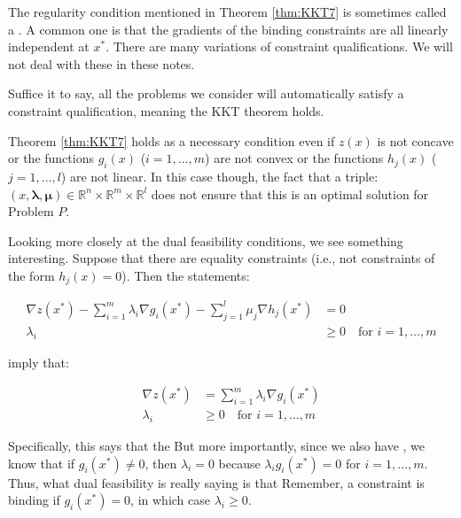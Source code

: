 \begin{remark} The regularity condition mentioned in Theorem \ref{thm:KKT7} is sometimes called a . A common one is that the gradients of the binding constraints are all linearly independent at ${x}^*$. There are many variations of constraint qualifications. We will not deal with these in these notes. 
    
    Suffice it to say, all the problems we consider will automatically satisfy a constraint qualification, meaning the KKT theorem holds.
\end{remark}

\begin{remark} Theorem \ref{thm:KKT7} holds as a necessary condition even if $z({x})$ is not concave or the functions $g_i({x})$ ($i=1,\dots,m$) are not convex or the functions $h_j({x})$ ($j=1,\dots,l$) are not linear. In this case though, the fact that a triple: $({x},\boldsymbol{\lambda}, \boldsymbol{\mu}) \in \mathbb{R}^{n} \times \mathbb{R}^m \times \mathbb{R}^l$ does not ensure that this is an optimal solution for Problem $P$.
\end{remark}

Looking more closely at the dual feasibility conditions, we see something interesting. Suppose that there are  equality constraints (i.e., not constraints of the form $h_j({x}) = 0$). Then the statements:

\begin{displaymath}
\begin{aligned}
\nabla z({x}^*) - \sum_{i = 1}^m\lambda_i \nabla g_i({x}^*) - \sum_{j = 1}^{l}\mu_j \nabla h_j({x}^*) & = {0}\\
\lambda_i &\geq 0 \quad \text{for $i=1,\dots,m$}
\end{aligned}
\end{displaymath}

imply that:

\begin{displaymath}
\begin{aligned}
\nabla z({x}^*) &= \sum_{i = 1}^m\lambda_i \nabla g_i({x}^*)\\
\lambda_i &\geq 0 \quad \text{for $i=1,\dots,m$}
\end{aligned}
\end{displaymath}

Specifically, this says that the  But more importantly, since we also have , we know that if ${g}_i({x}^*) \neq 0$, then $\lambda_i = 0$ because $\lambda_i g_i({x}^*) = 0$ for $i = 1,\dots,m$. Thus, what dual feasibility is really saying is that  Remember, a constraint is binding if $g_i({x}^*) = 0$, in which case $\lambda_i \geq 0$.


